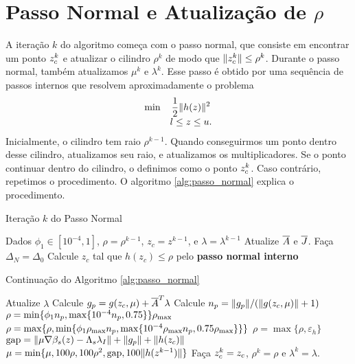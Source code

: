 \section{Passo Normal e Atualização de $\rho$}

A iteração $k$ do algoritmo começa com o passo normal,
que consiste em encontrar um ponto $z_c^{k}$ e atualizar o cilindro
$\rho^k$ de modo que $\Vert z_c^{k}\Vert \leq \rho^k$.
Durante o passo normal, também atualizamos $\mu^k$ e $\lambda^k$. 
Esse passo é obtido por uma sequência de passos internos que resolvem
aproximadamente o problema
\begin{equation}\visiblelbl{prob:normal_geral}
  \begin{array}{rc}
  \min & \displaystyle\meio\norma{h(z)}^2 \\
       & l \leq z \leq u.
  \end{array}
\end{equation}
Inicialmente, o cilindro tem raio $\rho^{k-1}$. 
Quando conseguirmos um ponto dentro desse cilindro, atualizamos seu raio, e
atualizamos os multiplicadores.  Se o ponto continuar dentro do cilindro, o
definimos como o ponto $z_c^{k}$. Caso contrário, repetimos o procedimento.  O
algoritmo \ref{alg:passo_normal} explica o procedimento.
\begin{algorithm}[H]
\caption{Iteração $k$ do Passo Normal}
\label{alg:passo_normal}
\begin{algorithmic}[1]
  \State Dados $\phi_1 \in [10^{-4},1]$, $\rho = \rho^{k-1}$, $z_c = z^{k-1}$, e $\lambda =
 \lambda^{k-1}$
\State Atualize $\overline{A}$ e $\overline{J}$.\label{alg:jacob_update}
\State Faça $\Delta_N = \Delta_0$
  \State Calcule $z_c$ tal que $h(z_c)\leq\rho$ pelo {\bf passo normal interno}
\end{algorithmic}
\end{algorithm}
\begin{algorithm}[H]
\caption*{Continuação do Algoritmo \ref{alg:passo_normal}}
\begin{algorithmic}
  \State Atualize $\lambda$\label{alg:lambda_update}
  \State Calcule $g_p = g(z_c,\mu) + \overline{A}^T\lambda$
  \State Calcule $n_p = \Vert g_p\Vert/(\Vert g(z_c,\mu)\Vert + 1)$
    \State $\rho = \min\{\phi_1n_p, \max\{10^{-4}n_p, 0.75\}\}\rho_{\max}$
  \Else
    \State $\rho = \max\{\rho, \min\{\phi_1\rho_{\max} n_p, \max\{10^{-4}\rho_{\max} n_p, 0.75\rho_{\max}\}
\}\}$
  \EndIf
  \State $\rho = \max\{\rho, \varepsilon_h\}$
  \State $\mbox{gap} = \Vert \mu\nabla \beta_s(z) - \Lambda_s\lambda_I\Vert + \Vert g_p\Vert + 
\Vert h(z_c)\Vert$
  \State $\mu = \min\{\mu, 100\rho, 100\rho^2, \mbox{gap}, 100\Vert h(z^{k-1})\Vert \}$
\label{alg:gap}
\EndWhile
\State Faça $z_c^{k} = z_c$, $\rho^k = \rho$ e $\lambda^k = \lambda$.
\end{algorithmic}
\end{algorithm}
